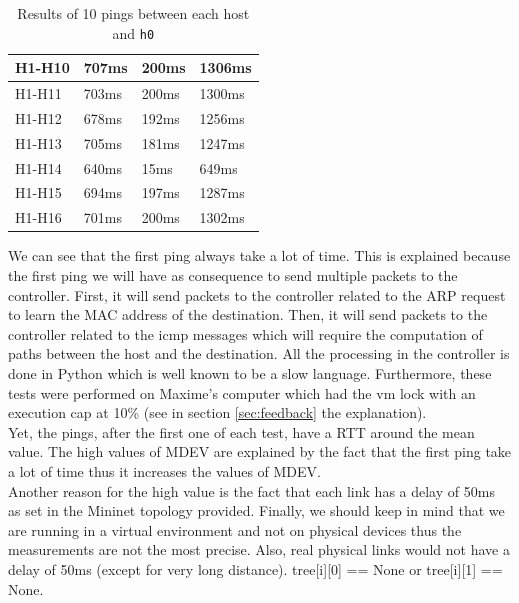 \documentclass[a4paper, 11pt, oneside]{article}
\begin{document}
\begin{table}[H]
\begin{table}[]
\begin{tabular}{|l|l|l|l|}
H1-H10                                      & 707ms                              & 200ms                              & 1306ms                                 \\ \hline
H1-H11                                     & 703ms                              & 200ms                              & 1300ms                                 \\ \hline
H1-H12                                     & 678ms                              & 192ms                              & 1256ms                                 \\ \hline
H1-H13                                     & 705ms                              & 181ms                              & 1247ms                                 \\ \hline
H1-H14                                     & 640ms                              & 15ms                              & 649ms                                 \\ \hline
H1-H15                                     & 694ms                              & 197ms                              & 1287ms                                 \\ \hline
H1-H16                                     & 701ms                              & 200ms                              & 1302ms                                 \\ \hline
\end{tabular}
\caption{Results of 10 pings between each host and \texttt{h0}}
\label{table:STCPings}
\end{table}
We can see that the first ping always take a lot of time. This is explained because the first ping we will have as consequence to send multiple packets to the controller. First, it will send packets to the controller related to the ARP request to learn the MAC address of the destination. Then, it will send packets to the controller related to the icmp messages which will require the computation of paths between the host and the destination. All the processing in the controller is done in Python which is well known to be a slow language. Furthermore, these tests were performed on Maxime's computer which had the vm lock with an execution cap at 10\% (see in section \ref{sec:feedback} the explanation).\\
Yet, the pings, after the first one of each test, have a RTT around the mean value. The high values of MDEV are explained by the fact that the first ping take a lot of time thus it increases the values of MDEV.\\
Another reason for the high value is the fact that each link has a delay of 50ms as set in the Mininet topology provided. Finally, we should keep in mind that we are running in a virtual environment and not on physical devices thus the measurements are not the most precise. Also, real physical links would not have a delay of 50ms (except for very long distance).
tree[i][0] == None or tree[i][1] == None.


\end{table}
\end{document}
